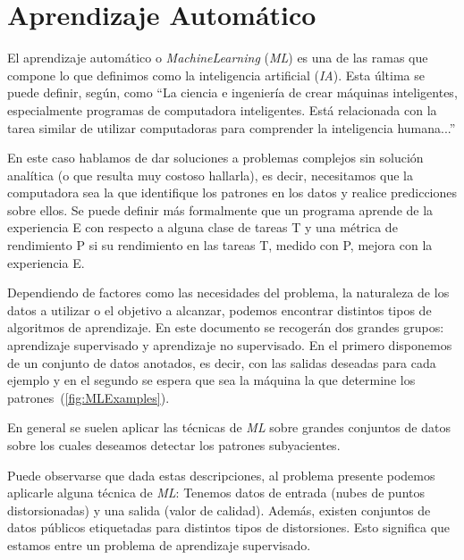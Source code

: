 
\section{Aprendizaje Automático}
El aprendizaje automático\cite{IAModernApproach} o \emph{MachineLearning} (\emph{ML}) 
es una de las ramas que compone lo que definimos como 
la inteligencia artificial (\emph{IA}). Esta última se puede definir, 
según\cite{WhatIsAI}, como 
``La ciencia e ingeniería 
de crear máquinas inteligentes, especialmente programas de computadora inteligentes. 
Está relacionada con la tarea similar de utilizar computadoras para comprender 
la inteligencia humana...''

En este caso hablamos de dar soluciones a problemas complejos sin 
solución analítica (o que resulta muy costoso hallarla), es decir, necesitamos que la computadora sea la que identifique
los patrones en los datos y realice predicciones sobre ellos\cite{LearningFromData}.
Se puede definir más formalmente que un programa aprende de la experiencia E con
respecto a alguna clase de tareas T y una métrica de rendimiento P si su
rendimiento en las tareas T, medido con P, mejora con la experiencia E\cite{TomMitchell}.

Dependiendo de factores como las necesidades del problema, la naturaleza
de los datos a utilizar o el objetivo a alcanzar, podemos encontrar distintos tipos de
algoritmos de aprendizaje. En este documento se recogerán dos grandes grupos: aprendizaje supervisado 
y aprendizaje no supervisado. En el primero disponemos de un conjunto de datos 
anotados, es decir, con las salidas deseadas para cada ejemplo y en el segundo 
se espera que sea la máquina la que determine los patrones~(\ref{fig:MLExamples}). 

En general se suelen aplicar las técnicas de \emph{ML} sobre grandes conjuntos 
de datos sobre los cuales deseamos detectar los patrones subyacientes\cite{
DataMiningHandbook}.

Puede observarse que dada estas descripciones, al problema presente podemos 
aplicarle alguna técnica de \emph{ML}: Tenemos datos de entrada (nubes de puntos 
distorsionadas) y una salida (valor de calidad). Además, existen conjuntos de 
datos públicos etiquetadas para distintos tipos de distorsiones. Esto significa que
estamos entre un problema de aprendizaje supervisado.


